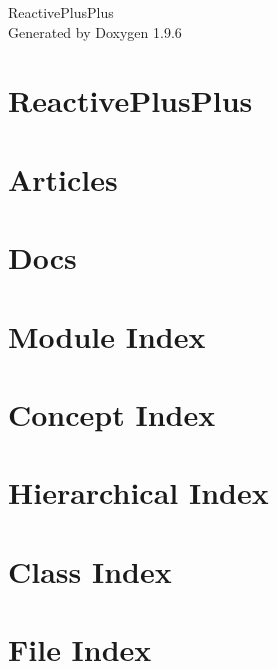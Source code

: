 \documentclass[twoside]{book}
\newcommand{\+}{\discretionary{\mbox{\scriptsize$\hookleftarrow$}}{}{}}
\newcommand{\clearemptydoublepage}{%
    \newpage{\pagestyle{empty}\cleardoublepage}%
  }
\begin{document}
  \raggedbottom
    \hypersetup{pageanchor=false,
                bookmarksnumbered=true,
                pdfencoding=unicode
               }
  \begin{titlepage}
  \vspace*{7cm}
  \begin{center}%
  {\Large Reactive\+Plus\+Plus}\\
  \vspace*{1cm}
  {\large Generated by Doxygen 1.9.6}\\
  \end{center}
  \end{titlepage}
  \clearemptydoublepage
  \tableofcontents
  \clearemptydoublepage
  \hypersetup{pageanchor=true}
\chapter{Reactive\+Plus\+Plus}
\label{index}\hypertarget{index}{}
\chapter{Articles}
\label{md_docs__articles}

\chapter{Docs}
\label{md_docs__docs}

\chapter{Module Index}

\chapter{Concept Index}

\chapter{Hierarchical Index}

\chapter{Class Index}

\chapter{File Index}

\end{document}
